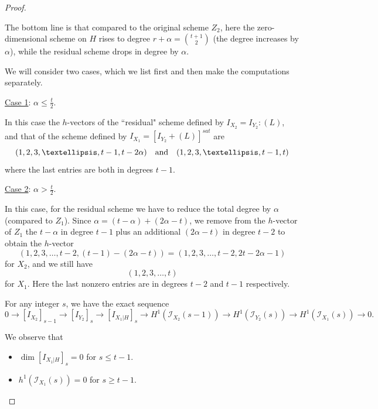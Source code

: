 \documentclass[10pt,a4paper]{amsart}
\begin{document}
\begin{proof}
\begin{itemize}
\end{itemize}

\noindent The bottom line is that compared to the original scheme $Z_2$, here the zero-dimensional scheme on $H$ rises to degree $r+\alpha = \binom{t+1}{2}$ (the degree increases by $\alpha$), while the residual scheme drops in degree by $\alpha$. 

We will consider two cases, which we list first and then make the computations separately.

\vspace{.2in}

\noindent \underline{Case 1}: $\alpha \leq \frac{t}{2}$.

In this case the $h$-vectors of the ``residual" scheme defined by $ I_{X_2} = I_{Y_2} : (L)$, and that of the scheme defined by $I_{X_1} = [I_{Y_2} +(L)]^{sat}$ are
\[
(1,2,3,\dots, t-1,t-2\alpha) \ \ \hbox{ and } \ \ (1,2,3,\dots, t-1, t)
\]
where the last entries are both in degrees $t-1$.

\vspace{.2in}

\noindent \underline{Case 2}: $\alpha > \frac{t}{2}$.

In this case, for the residual scheme we have to reduce the total degree by $\alpha$ (compared to $Z_1$). Since $\alpha = (t-\alpha) + (2\alpha - t)$, we remove from the $h$-vector of $Z_1$ the $t-\alpha$ in degree $t-1$ plus an additional $(2\alpha-t)$ in degree $t-2$ to obtain the $h$-vector 
\[
(1,2,3, \dots, t-2, (t-1) - (2\alpha -t) ) = (1,2,3,\dots, t-2, 2t-2\alpha -1)
\]
for $X_2$, and we still have 
\[
(1,2,3,\dots, t)
\]
for $X_1$.
Here the last nonzero entries are in degrees $t-2$ and $t-1$ respectively. 

 For any integer $s$, we have the exact sequence
\begin{equation} \label{double2}
0 \rightarrow [I_{X_2}]_{s-1} \rightarrow [I_{Y_2 }]_s \rightarrow [I_{X_1 |H}]_s \rightarrow H^1(\mathcal I_{X_2}(s-1)) \rightarrow H^1 (\mathcal I_{Y_2}(s)) \rightarrow H^1 (\mathcal I_{X_1}(s)) \rightarrow 0.
\end{equation}

\noindent We observe that

\begin{itemize}

\item[(i)] $\dim [I_{X_1|H}]_s = 0$ for $s \leq t-1$.

\item[(ii)] $h^1(\mathcal I_{X_1}(s)) = 0$ for $s \geq t-1$.


\end{itemize}
\end{proof}
\end{document}

